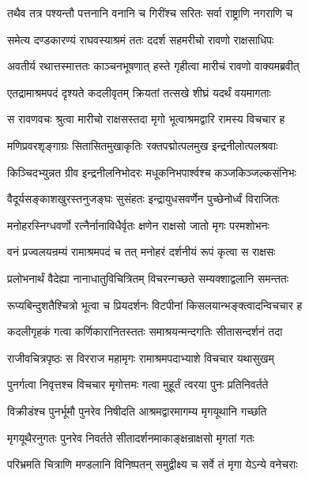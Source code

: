 \twolineshloka
{तथैव तत्र पश्यन्तौ पत्तनानि वनानि च}
{गिरींश्च सरितः सर्वा राष्ट्राणि नगराणि च} %

\twolineshloka
{समेत्य दण्डकारण्यं राघवस्याश्रमं ततः}
{ददर्श सहमरीचो रावणो राक्षसाधिपः} %

\twolineshloka
{अवतीर्य रथात्तस्मात्ततः काञ्चनभूषणात्}
{हस्ते गृहीत्वा मारीचं रावणो वाक्यमब्रवीत्} %

\twolineshloka
{एतद्रामाश्रमपदं दृश्यते कदलीवृतम्}
{क्रियतां तत्सखे शीघ्रं यदर्थं वयमागताः} %

\twolineshloka
{स रावणवचः श्रुत्वा मारीचो राक्षसस्तदा}
{मृगो भूत्वाश्रमद्वारि रामस्य विचचार ह} %

\twolineshloka
{मणिप्रवरशृङ्गाग्रः सितासितमुखाकृतिः}
{रक्तपद्मोत्पलमुख इन्द्रनीलोत्पलश्रवाः} %

\twolineshloka
{किञ्चिदभ्युन्नत ग्रीव इन्द्रनीलनिभोदरः}
{मधूकनिभपार्श्वश्च कञ्जकिञ्जल्कसंनिभः} %

\twolineshloka
{वैदूर्यसङ्काशखुरस्तनुजङ्घः सुसंहतः}
{इन्द्रायुधसवर्णेन पुच्छेनोर्ध्वं विराजितः} %

\twolineshloka
{मनोहरस्निग्धवर्णो रत्नैर्नानाविधैर्वृतः}
{क्षणेन राक्षसो जातो मृगः परमशोभनः} %

\twolineshloka
{वनं प्रज्वलयन्रम्यं रामाश्रमपदं च तत्}
{मनोहरं दर्शनीयं रूपं कृत्वा स राक्षसः} %

\twolineshloka
{प्रलोभनार्थं वैदेह्या नानाधातुविचित्रितम्}
{विचरन्गच्छते सम्यक्शाद्वलानि समन्ततः} %

\twolineshloka
{रूप्यबिन्दुशतैश्चित्रो भूत्वा च प्रियदर्शनः}
{विटपीनां किसलयान्भङ्क्त्वादन्विचचार ह} %

\twolineshloka
{कदलीगृहकं गत्वा कर्णिकारानितस्ततः}
{समाश्रयन्मन्दगतिः सीतासन्दर्शनं तदा} %

\twolineshloka
{राजीवचित्रपृष्ठः स विरराज महामृगः}
{रामाश्रमपदाभ्याशे विचचार यथासुखम्} %

\twolineshloka
{पुनर्गत्वा निवृत्तश्च विचचार मृगोत्तमः}
{गत्वा मुहूर्तं त्वरया पुनः प्रतिनिवर्तते} %

\twolineshloka
{विक्रीडंश्च पुनर्भूमौ पुनरेव निषीदति}
{आश्रमद्वारमागम्य मृगयूथानि गच्छति} %

\twolineshloka
{मृगयूथैरनुगतः पुनरेव निवर्तते}
{सीतादर्शनमाकाङ्क्षन्राक्षसो मृगतां गतः} %

\twolineshloka
{परिभ्रमति चित्राणि मण्डलानि विनिष्पतन्}
{समुद्वीक्ष्य च सर्वे तं मृगा येऽन्ये वनेचराः} %

